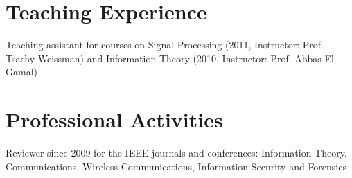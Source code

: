 \documentclass[margin]{res}
\begin{document}
\begin{resume}
\section{Teaching Experience}
Teaching assistant for courses on Signal Processing (2011, Instructor: Prof. Tsachy Weissman) and Information Theory (2010, Instructor: Prof. Abbas El Gamal)
\iffalse
\begin{itemize}
\item Introduction to Statistical Signal Processing. Instructor: Prof. Tsachy Weissman, 2012
\item Short course in Network Information Theory taught at Tsinghua University, China. Instructor: Prof. Abbas El Gamal, 2010
\end{itemize}
\fi
\iffalse
Teaching Assistant, EE278A: Introduction to Statistical Signal Processing \\
Taught by Prof. Tsachy Weissman, Fall 2012. 

Teaching Assistant for 
\fi


\section{Professional Activities}
Reviewer since 2009 for the IEEE journals and conferences: Information Theory, Communications, Wireless Communications, Information Security and Forensics
\iffalse
\begin{itemize}
\item IEEE Transactions on Information Theory 2009 - Current
\item IEEE Symposium on Information Theory 2009- Current 
\item Other IEEE Transactions: Communications, Wireless Communications, Information Security and Forensics 
\end{itemize}
\fi
\iffalse
\section{Community Service}
Military Service in the Singapore Army 2001 - 2003. %
\fi
\iffalse

\end{resume}
\end{document}
